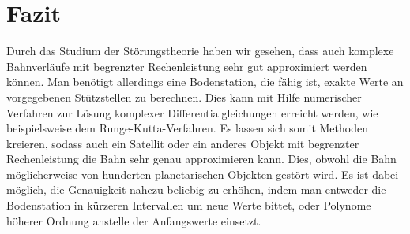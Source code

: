 \section{Fazit}
Durch das Studium der Störungstheorie haben wir gesehen, dass auch komplexe Bahnverläufe mit begrenzter Rechenleistung sehr gut approximiert werden können.
Man benötigt allerdings eine Bodenstation, die fähig ist, exakte Werte an vorgegebenen Stützstellen zu berechnen.
Dies kann mit Hilfe numerischer Verfahren zur Lösung komplexer Differentialgleichungen erreicht werden, wie beispielsweise dem Runge-Kutta-Verfahren.
Es lassen sich somit Methoden kreieren, sodass auch ein Satellit oder ein anderes Objekt mit begrenzter Rechenleistung die Bahn sehr genau approximieren kann.
Dies, obwohl die Bahn möglicherweise von hunderten planetarischen Objekten gestört wird.
Es ist dabei möglich, die Genauigkeit nahezu beliebig zu erhöhen, indem man entweder die Bodenstation in kürzeren Intervallen um neue Werte bittet,
oder Polynome höherer Ordnung anstelle der Anfangswerte einsetzt.